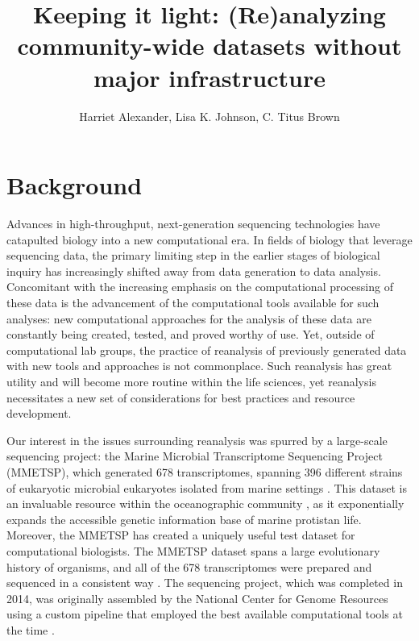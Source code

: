 \documentclass[12pt]{article}
\title{Keeping it light: (Re)analyzing community-wide datasets without major infrastructure}
\author{Harriet Alexander, Lisa K. Johnson, C. Titus Brown}
\begin{document}
  \maketitle


\section{Background}
Advances in high-throughput, next-generation sequencing technologies have catapulted biology into a new computational era. In fields of biology that leverage sequencing data, the primary limiting step in the earlier stages of biological inquiry has increasingly shifted away from data generation to data analysis. Concomitant with the increasing emphasis on the computational processing of these data is the advancement of the computational tools available for such analyses: new computational approaches for the analysis of these data are constantly being created, tested, and proved worthy of use. Yet, outside of computational lab groups, the practice of reanalysis of previously generated data with new tools and approaches is not commonplace. Such reanalysis has great utility and will become more routine within the life sciences, yet reanalysis necessitates a new set of considerations for best practices and resource development.



Our interest in the issues surrounding reanalysis was spurred by a large-scale sequencing project: the Marine Microbial Transcriptome Sequencing Project (MMETSP), which generated 678 transcriptomes, spanning 396 different strains of eukaryotic microbial eukaryotes isolated from marine settings \cite{Caron2016}. This dataset is an invaluable resource within the oceanographic community \cite{Keeling2014, Caron2016}, as it exponentially expands the accessible genetic information base of marine protistan life. Moreover, the MMETSP has created a uniquely useful test dataset for computational biologists. The MMETSP dataset spans a large evolutionary history of organisms, and all of the 678 transcriptomes were prepared and sequenced in a consistent way \cite{Keeling2014}. The sequencing project, which was completed in 2014, was originally assembled by the National Center for Genome Resources using a custom pipeline that employed the best available computational tools at the time \cite{Simpson2009, Huang1999}.
\end{document}
